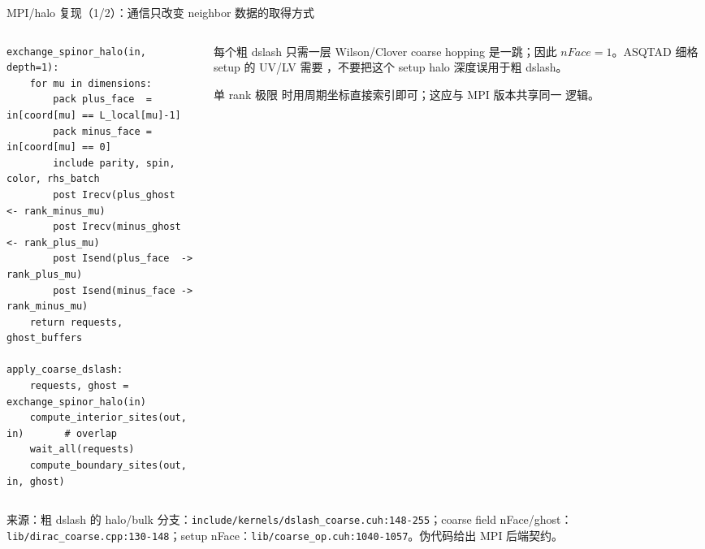 \documentclass[UTF8,aspectratio=169,11pt]{ctexbeamer}
\newcommand{\source}[1]{\vspace{0.05em}\par{\raggedright\scriptsize\color{muted}来源：#1\par}}
\newcommand{\codepath}[1]{\nolinkurl{#1}}
\begin{document}
\begin{frame}[fragile,t]{MPI/halo 复现（1/2）：通信只改变 neighbor 数据的取得方式}
  \begin{columns}[T,totalwidth=\textwidth]
    \begin{column}{0.49\textwidth}
      \begin{lstlisting}[firstnumber=1]
exchange_spinor_halo(in, depth=1):
    for mu in dimensions:
        pack plus_face  = in[coord[mu] == L_local[mu]-1]
        pack minus_face = in[coord[mu] == 0]
        include parity, spin, color, rhs_batch
        post Irecv(plus_ghost  <- rank_minus_mu)
        post Irecv(minus_ghost <- rank_plus_mu)
        post Isend(plus_face  -> rank_plus_mu)
        post Isend(minus_face -> rank_minus_mu)
    return requests, ghost_buffers

apply_coarse_dslash:
    requests, ghost = exchange_spinor_halo(in)
    compute_interior_sites(out, in)       # overlap
    wait_all(requests)
    compute_boundary_sites(out, in, ghost)
      \end{lstlisting}
    \end{column}
    \begin{column}{0.46\textwidth}
      \begin{block}{每个粗 dslash 只需一层}
        Wilson/Clover coarse hopping 是一跳；因此 \(nFace=1\)。ASQTAD 细格 setup 的 UV/LV 需要 \texttt{}，不要把这个 setup halo 深度误用于粗 dslash。
      \end{block}
      \begin{block}{单 rank 极限}
        \texttt{} 时用周期坐标直接索引即可；这应与 MPI 版本共享同一 \texttt{} 逻辑。
      \end{block}
    \end{column}
  \end{columns}
  \source{粗 dslash 的 halo/bulk 分支：\codepath{include/kernels/dslash_coarse.cuh:148-255}；coarse field nFace/ghost：\codepath{lib/dirac_coarse.cpp:130-148}；setup nFace：\codepath{lib/coarse_op.cuh:1040-1057}。伪代码给出 MPI 后端契约。}
\end{frame}
\end{document}
